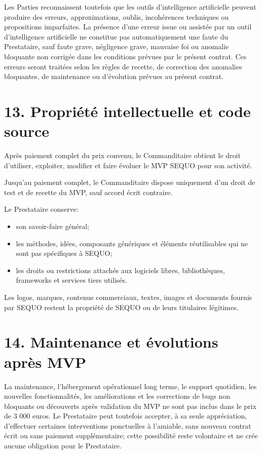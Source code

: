 \documentclass[11pt,a4paper]{article}
\begin{document}
Les Parties reconnaissent toutefois que les outils d'intelligence artificielle peuvent produire des erreurs, approximations, oublis, incohérences techniques ou propositions imparfaites. La présence d'une erreur issue ou assistée par un outil d'intelligence artificielle ne constitue pas automatiquement une faute du Prestataire, sauf faute grave, négligence grave, mauvaise foi ou anomalie bloquante non corrigée dans les conditions prévues par le présent contrat. Ces erreurs seront traitées selon les règles de recette, de correction des anomalies bloquantes, de maintenance ou d'évolution prévues au présent contrat.

\section*{13. Propriété intellectuelle et code source}

Après paiement complet du prix convenu, le Commanditaire obtient le droit d'utiliser, exploiter, modifier et faire évoluer le MVP SEQUO pour son activité.

Jusqu'au paiement complet, le Commanditaire dispose uniquement d'un droit de test et de recette du MVP, sauf accord écrit contraire.

Le Prestataire conserve:

\begin{itemize}
    \item son savoir-faire général;
    \item les méthodes, idées, composants génériques et éléments réutilisables qui ne sont pas spécifiques à SEQUO;
    \item les droits ou restrictions attachés aux logiciels libres, bibliothèques, frameworks et services tiers utilisés.
\end{itemize}

Les logos, marques, contenus commerciaux, textes, images et documents fournis par SEQUO restent la propriété de SEQUO ou de leurs titulaires légitimes.

\section*{14. Maintenance et évolutions après MVP}

La maintenance, l'hébergement opérationnel long terme, le support quotidien, les nouvelles fonctionnalités, les améliorations et les corrections de bugs non bloquants ou découverts après validation du MVP ne sont pas inclus dans le prix de 3 000 euros. Le Prestataire peut toutefois accepter, à sa seule appréciation, d'effectuer certaines interventions ponctuelles à l'amiable, sans nouveau contrat écrit ou sans paiement supplémentaire; cette possibilité reste volontaire et ne crée aucune obligation pour le Prestataire.
\end{document}
